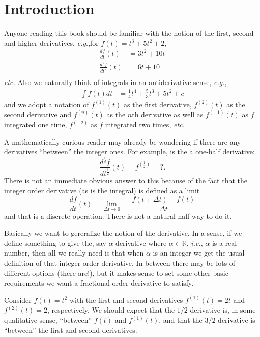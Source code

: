\chapter{Introduction}

Anyone reading this book should be familiar with the notion of the first, second and higher derivatives, \textit{e.g.},for $f(t) = t^3 + 5 t^2 + 2$, 
\begin{align}
  \frac{df}{dt}(t) &= 3 t^2 + 10 t \\
  \frac{d^2f}{dt^2}(t) &= 6t + 10 \\
  \label{eq:derivs}
\end{align}
\textit{etc.} Also we naturally think of integrals in an antiderivative sense, \textit{e.g.},
\begin{align}
  \int f(t) dt &= \frac{1}{4} t^4 + \frac{5}{3} t^3 + 5 t^2 + c 
  \label{eq:integrals}
\end{align}
and we adopt a notation of $f^{(1)}(t)$ as the first derivative, $f^{(2)}(t)$ as the second derivative and $f^{(n)}(t)$ as the $n$th derivative as well as $f^{(-1)}(t)$ as $f$ integrated one time, $f^{(-2)}$ as $f$ integrated two times, \textit{etc.}

A mathematically curious reader may already be wondering if there are any derivatives ``between'' the integer ones. For example, is the a one-half derivative:
\begin{equation}
  \frac{d^\frac{1}{d} f}{d t^\frac{1}{2}}(t) = f^{\left(\frac{1}{2}\right)} = ?.
  \label{eq:halfderiv}
\end{equation}
There is not an immediate obvious answer to this because of the fact that the integer order derivative (as is the integral) is defined as a limit
\begin{equation}
  \frac{df}{dt}(t) = \lim_{\Delta t \rightarrow 0} = \frac{f\left(t + \Delta t \right) - f\left(t\right)}{\Delta t}
  \label{eq:limdef}
\end{equation}
and that is a discrete operation. There is not a natural half way to do it.

Basically we want to gereralize the notion of the derivative. In a sense, if we define something to give the, say $\alpha$ derivative where $\alpha \in \mathbb R$, \textit{i.e.}, $\alpha$ is a real number, then all we really need is that when $\alpha$ is an integer we get the usual definition of that integer order derivative. In between there may be lots of different options (there are!), but it makes sense to set some other basic requirements we want a fractional-order derivative to satisfy.

\begin{example}
  Consider $f(t) = t^2$ with the first and second derivatives $f^{(1)}(t) = 2 t$ and $f^{(2)}(t) = 2$, respectively. We should expect that the $1/2$ derivative is, in some qualitative sense, ``between'' $f(t)$ and $f^{(1)}(t)$, and that the $3/2$ derivative is ``between'' the first and second derivatives. 

  
\end{example}

